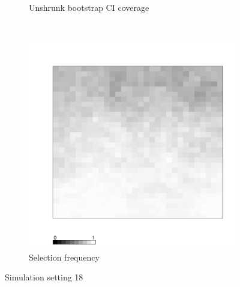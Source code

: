 \documentclass[authoryear, review, 11pt]{elsarticle}
\begin{document}
\begin{figure}
\begin{subfigure}[b]{0.45\textwidth}
		\caption{Unshrunk bootstrap CI coverage}
	\end{subfigure}%
	~ %
	\begin{subfigure}[b]{0.45\textwidth}
	\centering
		\includegraphics[width=\textwidth]{../../figures/simulation/X1.15.18.selection.pdf}
		\caption{Selection frequency}
	\end{subfigure}
	\caption{Simulation setting 18}
\end{figure}
\end{document}
